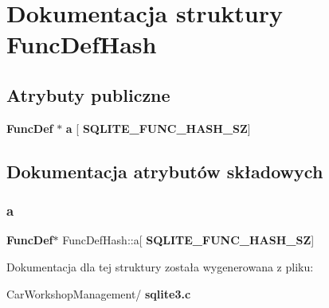 \section{Dokumentacja struktury Func\+Def\+Hash}
\label{struct_func_def_hash}
\subsection*{Atrybuty publiczne}
\begin{DoxyCompactItemize}
\item 
\textbf{ Func\+Def} $\ast$ \textbf{ a} [\textbf{ S\+Q\+L\+I\+T\+E\+\_\+\+F\+U\+N\+C\+\_\+\+H\+A\+S\+H\+\_\+\+SZ}]
\end{DoxyCompactItemize}


\subsection{Dokumentacja atrybutów składowych}
\mbox{\label{struct_func_def_hash_aaab2cd9c5f40d92c236f8fdeb2d9849a}} 
\subsubsection{a}
{\footnotesize\ttfamily \textbf{ Func\+Def}$\ast$ Func\+Def\+Hash\+::a[\textbf{ S\+Q\+L\+I\+T\+E\+\_\+\+F\+U\+N\+C\+\_\+\+H\+A\+S\+H\+\_\+\+SZ}]}



Dokumentacja dla tej struktury została wygenerowana z pliku\+:\begin{DoxyCompactItemize}
\item 
Car\+Workshop\+Management/\textbf{ sqlite3.\+c}\end{DoxyCompactItemize}
